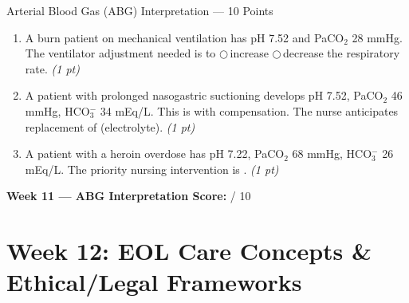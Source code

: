 \documentclass[11pt,letterpaper]{article}
\newcommand{\blank}[1][3cm]{\underline{\hspace{#1}}}
\begin{document}
\begin{diagbox}{Arterial Blood Gas (ABG) Interpretation --- 10 Points}
\begin{enumerate}[leftmargin=1.5em, label=\textbf{\arabic*.},start=131]
  \item A burn patient on mechanical ventilation has pH 7.52 and PaCO$_2$ 28 mmHg.
        The ventilator adjustment needed is to
        $\bigcirc$\,increase \quad$\bigcirc$\,decrease
        the respiratory rate.
        \hfill\textit{(1 pt)}

  \item A patient with prolonged nasogastric suctioning develops pH 7.52,
        PaCO$_2$ 46 mmHg, HCO$_3^-$ 34 mEq/L.  This is
        \blank[3cm] \blank[3cm] with \blank[3cm] compensation.
        The nurse anticipates replacement of \blank[2.5cm] (electrolyte).
        \hfill\textit{(1 pt)}

  \item A patient with a heroin overdose has pH 7.22, PaCO$_2$ 68 mmHg,
        HCO$_3^-$ 26 mEq/L.  The priority nursing intervention is
        \blank[6cm].
        \hfill\textit{(1 pt)}

\end{enumerate}

\vspace{0.3cm}
\textbf{Week 11 --- ABG Interpretation Score:} \blank[1cm] / 10
\end{diagbox}

\newpage


\section{Week 12: EOL Care Concepts \& Ethical/Legal Frameworks}
\end{document}
